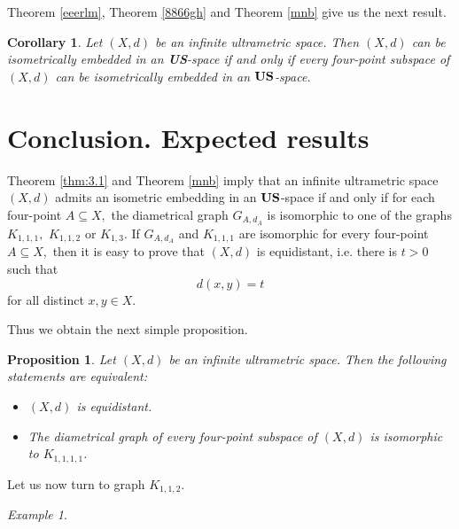 \documentclass[11pt]{article}
\newtheorem{corollary}[theorem]{Corollary}
\newtheorem{proposition}[theorem]{Proposition}
\theoremstyle{definition}
\theoremstyle{remark}
\newtheorem{example}[theorem]{Example}
\numberwithin{equation}{section}
\begin{document}
Theorem \ref{eeerlm}, Theorem \ref{8866gh} and Theorem \ref{mnb} give us the next result.


\begin{corollary}
    \label{eehgg}
Let $(X,d)$ be an infinite ultrametric space. 
Then $(X,d)$ can be isometrically embedded in an {\bf US}-space
if and only if every four-point subspace of $(X,d)$ can be
isometrically embedded in an ${\bf US}$-space.
\end{corollary}



\section{Conclusion. Expected results}

Theorem \ref{thm:3.1} and Theorem \ref{mnb}  imply that an infinite ultrametric space $(X,d)$ 
admits an isometric embedding in an ${\bf US}$-space 
if and only if for each four-point $A \subseteq X,$ the diametrical 
graph $G_{A,d_A}$ is isomorphic to one of the graphs 
$K_{1,1,1},$ $K_{1,1,2}$ or $K_{1,3}.$
If $G_{A,d_A} $ and $K_{1,1,1}$ are isomorphic 
for every four-point $A \subseteq X,$ then it is easy to prove that 
$(X,d)$ is equidistant, i.e. there is $t>0$ such that
\[
d(x,y) = t 
\]
for all distinct $ x,y \in X.$

Thus we obtain the next simple proposition.

\begin{proposition}
\label{gjjt}
Let $(X,d)$ be an infinite  ultrametric space.  
Then the following statements are equivalent:

\begin{itemize}[left=10pt]

    \item[(i)] $(X,d)$ is equidistant.
    \item[(ii)] The diametrical graph of every four-point subspace of $(X,d)$ is isomorphic to $K_{1,1,1,1}$.
\end{itemize}
\end{proposition}



Let us now turn to graph $K_{1,1,2}$.

\begin{example}
    
\end{example}
\end{document}
